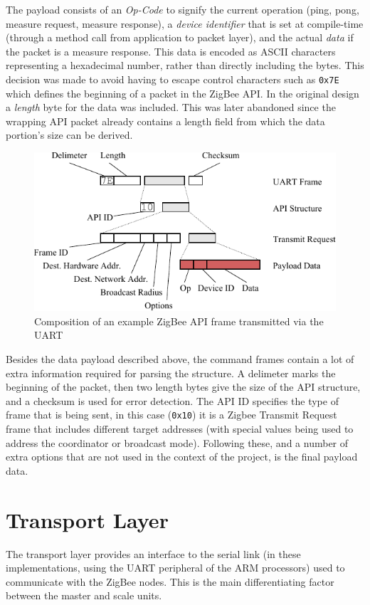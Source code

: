 The payload consists of an \emph{Op-Code} to signify the current operation (ping, pong, measure request, measure response), a \emph{device identifier} that is set at compile-time (through a method call from application to packet layer), and the actual \emph{data} if the packet is a measure response. This data is encoded as ASCII characters representing a hexadecimal number, rather than directly including the bytes. This decision was made to avoid having to escape control characters such as \texttt{0x7E} which defines the beginning of a packet in the ZigBee API. In the original design a \emph{length} byte for the data was included. This was later abandoned since the wrapping API packet already contains a length field from which the data portion's size can be derived.


\begin{figure}
\includegraphics[width=\textwidth]{images/packets.pdf}
\caption{Composition of an example ZigBee API frame transmitted via the UART}
\label{packets-example}
\end{figure}

Besides the data payload described above, the command frames contain a lot of extra information required for parsing the structure. A delimeter marks the beginning of the packet, then two length bytes give the size of the API structure, and a checksum is used for error detection. The API ID specifies the type of frame that is being sent, in this case (\texttt{0x10}) it is a Zigbee Transmit Request frame that includes different target addresses (with special values being used to address the coordinator or broadcast mode). Following these, and a number of extra options that are not used in the context of the project, is the final payload data.

\section{Transport Layer}
The transport layer provides an interface to the serial link (in these implementations, using the UART peripheral of the ARM processors) used to communicate with the ZigBee nodes. This is the main differentiating factor between the master and scale units.

